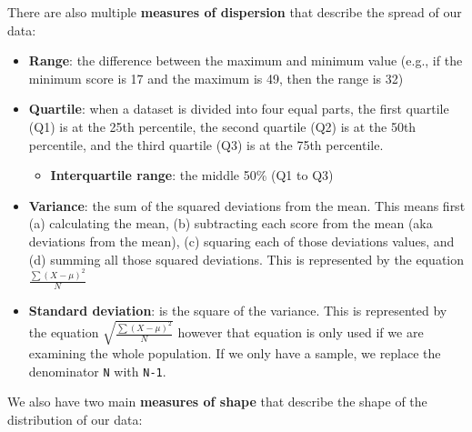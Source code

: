 \documentclass[
]{book}
\providecommand{\tightlist}{%
  \setlength{\itemsep}{0pt}\setlength{\parskip}{0pt}}
\begin{document}
There are also multiple \textbf{measures of dispersion} that describe the spread of our data:

\begin{itemize}
\item
  \textbf{Range}: the difference between the maximum and minimum value (e.g., if the minimum score is 17 and the maximum is 49, then the range is 32)
\item
  \textbf{Quartile}: when a dataset is divided into four equal parts, the first quartile (Q1) is at the 25th percentile, the second quartile (Q2) is at the 50th percentile, and the third quartile (Q3) is at the 75th percentile.

  \begin{itemize}
  \tightlist
  \item
    \textbf{Interquartile range}: the middle 50\% (Q1 to Q3)
  \end{itemize}
\item
  \textbf{Variance}: the sum of the squared deviations from the mean. This means first (a) calculating the mean, (b) subtracting each score from the mean (aka deviations from the mean), (c) squaring each of those deviations values, and (d) summing all those squared deviations. This is represented by the equation \(\frac{\sum (X-\mu)^2}{N}\)
\item
  \textbf{Standard deviation}: is the square of the variance. This is represented by the equation \(\sqrt{\frac{\sum (X-\mu)^2}{N}}\) however that equation is only used if we are examining the whole population. If we only have a sample, we replace the denominator \texttt{N} with \texttt{N-1}.
\end{itemize}

We also have two main \textbf{measures of shape} that describe the shape of the distribution of our data:
\end{document}
